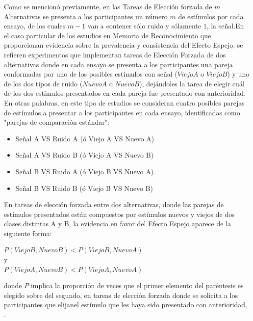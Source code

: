 \begin{itemize}
Como se mencionó previamente, en las Tareas de Elección forzada de $m$ Alternativas se presenta a los participantes un número $m$ de estímulos por cada ensayo, de los cuales $m-1$ van a contener sólo ruido y sólamente $1$, la señal.En el caso particular de los estudios en Memoria de Reconocimiento que proporcionan evidencia sobre la prevalencia y consistencia del Efecto Espejo, se refieren experimentos que implementan tareas de Elección Forzada de dos alternativas donde en cada ensayo se presenta a los participantes una pareja conformadas por uno de los posibles estímulos con señal ($ViejoA$ o $ViejoB$) y uno de los dos tipos de ruido ($NuevoA$ o $NuevoB$), dejándoles la tarea de elegir cuál de los dos estímulos presentados en cada pareja fue presentado con anterioridad. En otras palabras, en este tipo de estudios se consideran cuatro posibles parejas de estímulos a presentar a los participantes en cada ensayo, identificadas como "parejas de comparación estándar":\\

\begin{itemize}
\item Señal A VS Ruido A  (ó Viejo A VS Nuevo A)\\
\item Señal A VS Ruido B (ó Viejo A VS Nuevo B)\\
\item Señal B VS Ruido A (ó Viejo B VS Nuevo A)\\
\item Señal B VS Ruido B (ó Viejo B VS Nuevo B)\\
\end{itemize}

En tareas de elección forzada entre dos alternativas, donde las parejas de estímulos presentados están compuestos por estímulos nuevos y viejos de dos clases distintas A y B, la evidencia en favor del Efecto Espejo aparece de la siguiente forma:\\

\begin{center}
$P(ViejoB, NuevoB) < P(ViejoB,NuevoA)$\\
y\\
$P(ViejoA, NuevoB) < P(ViejoA,NuevoA)$\\
\end{center}
\begin{center}
donde $P$ implica la proporción de veces que el primer elemento del paréntesis es elegido sobre del segundo, en tareas de elección forzada donde se solicita a los participantes que elijanel estímulo que les haya sido presentado con anterioridad, \parencite{Glanzer1993}.\\
\end{center}


\end{itemize}
